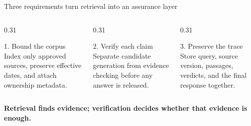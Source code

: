 \begin{frame}{Three requirements turn retrieval into an assurance layer}
  \begin{columns}[T,onlytextwidth]
    \begin{column}{0.31\textwidth}
      \begin{block}{1. Bound the corpus}
        Index only approved sources, preserve effective dates, and attach ownership metadata.
      \end{block}
    \end{column}
    \begin{column}{0.31\textwidth}
      \begin{block}{2. Verify each claim}
        Separate candidate generation from evidence checking before any answer is released.
      \end{block}
    \end{column}
    \begin{column}{0.31\textwidth}
      \begin{block}{3. Preserve the trace}
        Store query, source version, passages, verdicts, and the final response together.
      \end{block}
    \end{column}
  \end{columns}

  \vfill
  \centering
  \color{ArborNavy}\large\bfseries
  Retrieval finds evidence; verification decides whether that evidence is enough.
\end{frame}
